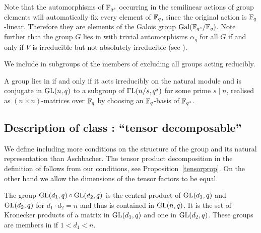 Note that the automorphisms of $\mathbb{F}_{q^s}$ occurring in the semilinear
actions of group elements will automatically fix every element of $\mathbb{F}_q$, 
since the original action is $\mathbb{F}_q$-linear. Therefore they are elements of
the Galois group $\Gal(\F_{q^s}/\F_q)$. Note further that
the group $G$ lies in  
with trivial automorphisms $\alpha_g$ for all $G$ if and only if
$V$ is irreducible but not absolutely irreducible (see \cite[(29.13)]{CR0}).

\medskip
{}
We include in  subgroups of the members of  excluding all
groups acting reducibly.

\smallskip
\stru
A group lies in  if and only if it acts irreducibly on the natural
module and is conjugate in $\GL(n,q)$ to a subgroup of $\GGL(n/s,q^s)$ for
some prime $s \mid n$, realised as $(n \times n)$-matrices over $\mathbb{F}_q$
by choosing an $\mathbb{F}_q$-basis of $\mathbb{F}_{q^s}$.


\subsection{Description of class : ``tensor decomposable''}
\label{descD4}


We define  including more conditions on the structure of the
group and its natural representation than Aschbacher. The tensor
product decomposition in the definition of  follows from our
conditions, see Proposition~\ref{tensorprop}. On the other
hand we allow the dimensions of the tensor factors to be equal.

\smallskip
\exmemb
The group $\GL(d_1,q) \circ \GL(d_2,q)$ is the central
product of $\GL(d_1,q)$ and $\GL(d_2,q)$ for $d_1 \cdot d_2 = n$ and
thus is contained in $\GL(n,q)$. It is
the set of Kronecker products of a matrix in $\GL(d_1,q)$ and one in
$\GL(d_2,q)$. These groups are members in  if $1 < d_1 < n$.


